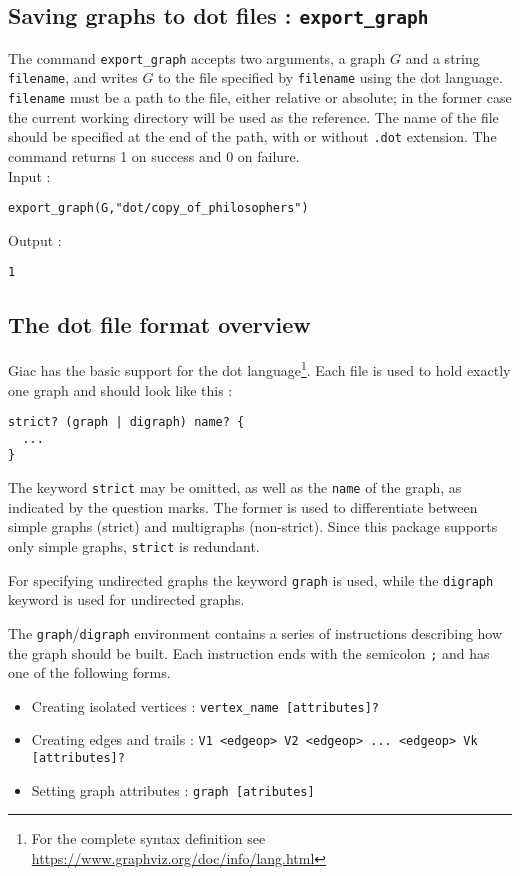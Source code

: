 \documentclass[a4paper,11pt]{article}
\begin{document}
\subsection{Saving graphs to {\sf dot} files : {\tt export\_graph}}

The command {\tt export\_graph} accepts two arguments, a graph $ G $ and a string {\tt filename}, and writes $ G $ to the file specified by {\tt filename} using the {\sf dot} language. {\tt filename} must be a path to the file, either relative or absolute; in the former case the current working directory will be used as the reference. The name of the file should be specified at the end of the path, with or without {\tt .dot} extension. The command returns 1 on success and 0 on failure.\\
Input :
\begin{center}
  \tt export\_graph(G,"dot/copy\_of\_philosophers")
\end{center}
Output :
\begin{center}
  \tt 1
\end{center}

\subsection{The {\sf dot} file format overview}\label{sec:dotformat}

Giac has the basic support for the {\sf dot} language\footnote{For the complete syntax definition see \url{https://www.graphviz.org/doc/info/lang.html}}. Each file is used to hold exactly one graph and should look like this :
\begin{verbatim}
strict? (graph | digraph) name? {
  ...
}
\end{verbatim}
The keyword {\tt strict} may be omitted, as well as the {\tt name} of the graph, as indicated by the question marks. The former is used to differentiate between simple graphs (strict) and multigraphs (non-strict). Since this package supports only simple graphs, {\tt strict} is redundant.

For specifying undirected graphs the keyword {\tt graph} is used, while the {\tt digraph} keyword is used for undirected graphs.

The {\tt graph}/{\tt digraph} environment contains a series of instructions describing how the graph should be built. Each instruction ends with the semicolon {\tt ;} and has one of the following forms.
\begin{itemize}
  \item Creating isolated vertices : {\tt vertex\_name [attributes]?}
  \item Creating edges and trails : {\tt V1 <edgeop> V2 <edgeop> ... <edgeop> Vk [attributes]?}
  \item Setting graph attributes : {\tt graph [atributes]}
\end{itemize}
\end{document}
